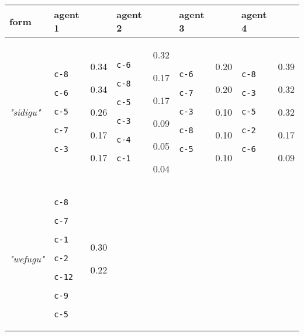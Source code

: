 
{\renewcommand{\arraystretch}{1.5}
\begin{tabular}{@{}p{1.2cm}|p{1.3cm}@{}p{0.8cm}@{}|p{1.3cm}@{}p{0.8cm}@{}|p{1.3cm}@{}p{0.8cm}@{}|p{1.3cm}@{}p{0.8cm}@{}}
form & agent 1 &  & agent 2 &  & agent 3 &  & agent 4 & \\
\hline
\textit{"sidigu"} & \texttt{c-8}

\texttt{c-6}

\texttt{c-5}

\texttt{c-7}

\texttt{c-3} & 0.34

0.34

0.26

0.17

0.17 & \texttt{c-6}

\texttt{c-8}

\texttt{c-5}

\texttt{c-3}

\texttt{c-4}

\texttt{c-1} & 0.32

0.17

0.17

0.09

0.05

0.04 & \texttt{c-6}

\texttt{c-7}

\texttt{c-3}

\texttt{c-8}

\texttt{c-5} & 0.20

0.20

0.10

0.10

0.10 & \texttt{c-8}

\texttt{c-3}

\texttt{c-5}

\texttt{c-2}

\texttt{c-6} & 0.39

0.32

0.32

0.17

0.09\\
\hline
\textit{"wefugu"} & \texttt{c-8}

\texttt{c-7}

\texttt{c-1}

\texttt{c-2}

\texttt{c-12}

\texttt{c-9}

\texttt{c-5} & 0.30

0.22


\end{tabular}}
